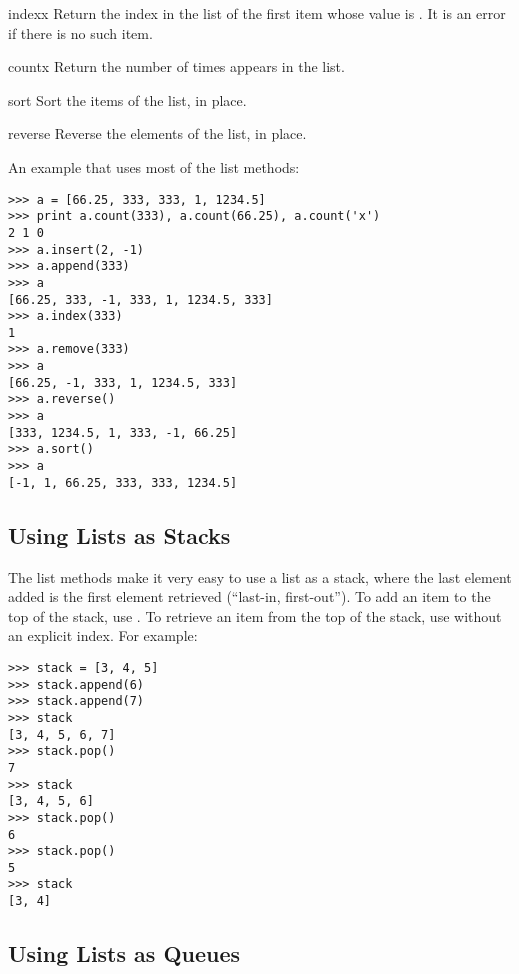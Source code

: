 \documentclass{manual}
\begin{document}
\begin{methoddesc}[list]{index}{x}
Return the index in the list of the first item whose value is .
It is an error if there is no such item.
\end{methoddesc}

\begin{methoddesc}[list]{count}{x}
Return the number of times  appears in the list.
\end{methoddesc}

\begin{methoddesc}[list]{sort}{}
Sort the items of the list, in place.
\end{methoddesc}

\begin{methoddesc}[list]{reverse}{}
Reverse the elements of the list, in place.
\end{methoddesc}

An example that uses most of the list methods:

\begin{verbatim}
>>> a = [66.25, 333, 333, 1, 1234.5]
>>> print a.count(333), a.count(66.25), a.count('x')
2 1 0
>>> a.insert(2, -1)
>>> a.append(333)
>>> a
[66.25, 333, -1, 333, 1, 1234.5, 333]
>>> a.index(333)
1
>>> a.remove(333)
>>> a
[66.25, -1, 333, 1, 1234.5, 333]
>>> a.reverse()
>>> a
[333, 1234.5, 1, 333, -1, 66.25]
>>> a.sort()
>>> a
[-1, 1, 66.25, 333, 333, 1234.5]
\end{verbatim}


\subsection{Using Lists as Stacks \label{lists-as-stacks}}

The list methods make it very easy to use a list as a stack, where the
last element added is the first element retrieved (``last-in,
first-out'').  To add an item to the top of the stack, use
.  To retrieve an item from the top of the stack, use
 without an explicit index.  For example:

\begin{verbatim}
>>> stack = [3, 4, 5]
>>> stack.append(6)
>>> stack.append(7)
>>> stack
[3, 4, 5, 6, 7]
>>> stack.pop()
7
>>> stack
[3, 4, 5, 6]
>>> stack.pop()
6
>>> stack.pop()
5
>>> stack
[3, 4]
\end{verbatim}


\subsection{Using Lists as Queues \label{lists-as-queues}}
\end{document}
